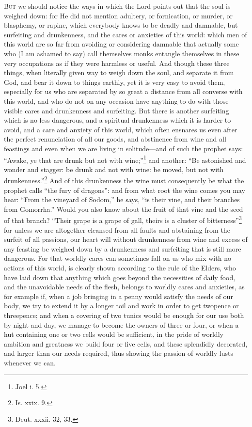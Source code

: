 \textsc{But} we should notice the ways in which the Lord points out that the soul is weighed down: for He did not mention adultery, or fornication, or murder, or blasphemy, or rapine, which everybody knows to be deadly and damnable, but surfeiting and drunkenness, and the cares or anxieties of this world: which men of this world are so far from avoiding or considering damnable that actually some who (I am ashamed to say) call themselves monks entangle themselves in these very occupations as if they were harmless or useful. And though these three things, when literally given way to weigh down the soul, and separate it from God, and bear it down to things earthly, yet it is very easy to avoid them, especially for us who are separated by so great a distance from all converse with this world, and who do not on any occasion have anything to do with those visible cares and drunkenness and surfeiting. But there is another surfeiting which is no less dangerous, and a spiritual drunkenness which it is harder to avoid, and a care and anxiety of this world, which often ensnares us even after the perfect renunciation of all our goods, and abstinence from wine and all feastings and even when we are living in solitude—and of such the prophet says: “Awake, ye that are drunk but not with wine;”\footnote{Joel i. 5.} and another: “Be astonished and wonder and stagger: be drunk and not with wine: be moved, but not with drunkenness.”\footnote{Is. xxix. 9.} And of this drunkenness the wine must consequently be what the prophet calls “the fury of dragons”: and from what root the wine comes you may hear: “From the vineyard of Sodom,” he says, “is their vine, and their branches from Gomorrha.” Would you also know about the fruit of that vine and the seed of that branch? “Their grape is a grape of gall, theirs is a cluster of bitterness”\footnote{Deut. xxxii. 32, 33.} for unless we are altogether cleansed from all faults and abstaining from the surfeit of all passions, our heart will without drunkenness from wine and excess of any feasting be weighed down by a drunkenness and surfeiting that is still more dangerous. For that worldly cares can sometimes fall on us who mix with no actions of this world, is clearly shown according to the rule of the Elders, who have laid down that anything which goes beyond the necessities of daily food, and the unavoidable needs of the flesh, belongs to worldly cares and anxieties, as for example if, when a job bringing in a penny would satisfy the needs of our body, we try to extend it by a longer toil and work in order to get twopence or threepence; and when a covering of two tunics would be enough for our use both by night and day, we manage to become the owners of three or four, or when a hut containing one or two cells would be sufficient, in the pride of worldly ambition and greatness we build four or five cells, and these splendidly decorated, and larger than our needs required, thus showing the passion of worldly lusts whenever we can.

